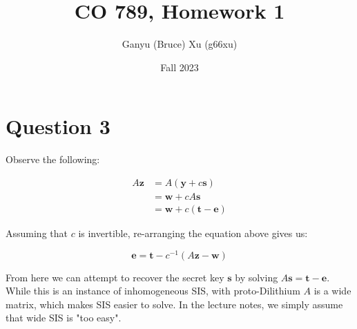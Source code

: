 \documentclass{article}
\title{CO 789, Homework 1}
\author{Ganyu (Bruce) Xu (g66xu)}
\date{Fall 2023}
\begin{document}

\section*{Question 3}

Observe the following:

$$
\begin{aligned}
A\mathbf{z} &= A(\mathbf{y} + c\mathbf{s}) \\
&= \mathbf{w} + cA\mathbf{s} \\
&= \mathbf{w} + c(\mathbf{t} - \mathbf{e})
\end{aligned}
$$

Assuming that $c$ is invertible, re-arranging the equation above gives us:

$$
\mathbf{e} = \mathbf{t} - c^{-1}(A\mathbf{z} - \mathbf{w})
$$

From here we can attempt to recover the secret key $\mathbf{s}$ by solving $A\mathbf{s} = \mathbf{t} - \mathbf{e}$. While this is an instance of inhomogeneous SIS, with proto-Dilithium $A$ is a wide matrix, which makes SIS easier to solve. In the lecture notes, we simply assume that wide SIS is "too easy".
\end{document}
